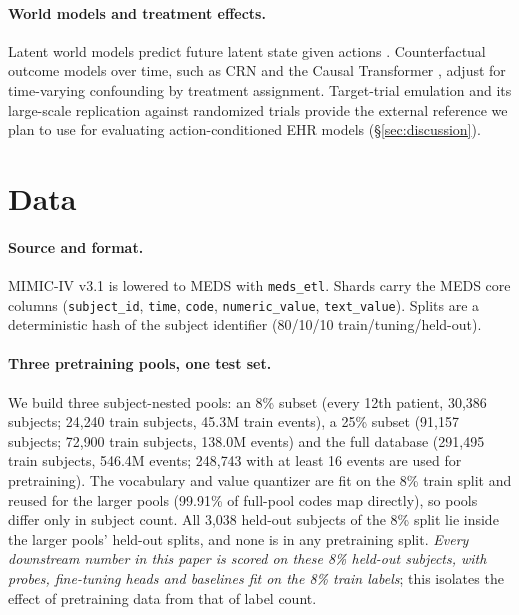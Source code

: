 \documentclass[10pt,letterpaper]{article}
\newcommand{\code}[1]{\texttt{\small #1}}
\begin{document}
\paragraph{World models and treatment effects.}
Latent world models predict future latent state given actions
\citep{worldmodels,vjepa2}. Counterfactual outcome models over time, such as
CRN \citep{crn} and the Causal Transformer \citep{causaltransformer}, adjust
for time-varying confounding by treatment assignment. Target-trial emulation
\citep{hernan2016} and its large-scale replication against randomized trials
\citep{rctduplicate} provide the external reference we plan to use for
evaluating action-conditioned EHR models (\S\ref{sec:discussion}).

\section{Data}
\label{sec:data}

\paragraph{Source and format.}
MIMIC-IV v3.1 \citep{mimiciv} is lowered to MEDS with \code{meds\_etl}. Shards
carry the MEDS core columns (\code{subject\_id}, \code{time}, \code{code},
\code{numeric\_value}, \code{text\_value}). Splits are a deterministic hash of
the subject identifier (80/10/10 train/tuning/held-out).

\paragraph{Three pretraining pools, one test set.}
We build three subject-nested pools: an 8\% subset (every 12th patient,
30{,}386 subjects; 24{,}240 train subjects, 45.3M train events), a 25\% subset
(91{,}157 subjects; 72{,}900 train subjects, 138.0M events) and the full
database (291{,}495 train subjects, 546.4M events; 248{,}743 with at least 16
events are used for pretraining). The vocabulary and value quantizer are fit on
the 8\% train split and reused for the larger pools (99.91\% of full-pool
codes map directly), so pools differ only in subject count. All 3{,}038
held-out subjects of the 8\% split lie inside the larger pools' held-out
splits, and none is in any pretraining split. \emph{Every downstream number in
this paper is scored on these 8\% held-out subjects, with probes, fine-tuning
heads and baselines fit on the 8\% train labels}; this isolates the effect of
pretraining data from that of label count.
\end{document}
